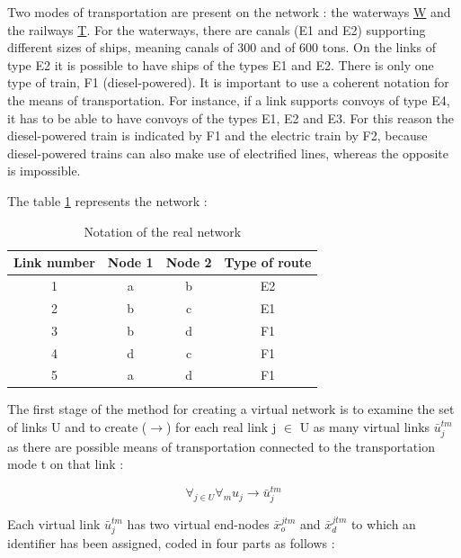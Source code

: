 Two modes of transportation are present on the network : the waterways 
\underline{W} and the railways \underline{T}. For the waterways, there are canals (E1
and E2) supporting different sizes of ships, meaning canals of 300 and of 600
tons.  On the links of type E2 it is possible to have ships of the types E1 and
E2.  There is only one type of train, F1 (diesel-powered).  It is important
to use a coherent notation for the means of transportation.  For instance, if a
link supports convoys of type E4, it has to be able to have convoys of the types
E1, E2 and E3.  For this reason the diesel-powered train is indicated by F1
and the electric train by F2, because diesel-powered trains can also
make use of electrified lines, whereas the opposite is impossible.


The table \ref{tab3_1} represents the network :

\begin{table}[htbp]
\begin{center}
\begin{tabular}{cccc}
\hline
Link number & Node 1 & Node 2 & Type of route\\
\hline
1 & a & b & E2\\

2 & b & c & E1\\

3 & b & d & F1\\

4 & d & c & F1\\

5 & a & d & F1\\
\hline
\end{tabular}
\caption{\label{tab3_1} Notation of the real network}
\end{center}
\end{table}


The first stage of the method for creating a virtual network is to examine the
set of links U and to create ($\rightarrow$) for each real link j $\in$ U as
many virtual links $\bar u_j^{tm}$ as there are possible means of transportation
connected to the transportation mode t on that link :

$$\forall _{j\in U} \forall _m u_j \rightarrow \bar u_j^{tm}$$


Each virtual link $\bar u_j^{tm}$ has two virtual end-nodes $\bar x_o^{jtm}$ and
$\bar x_d^{jtm}$ to which an identifier has been assigned, coded in four parts
as follows :


